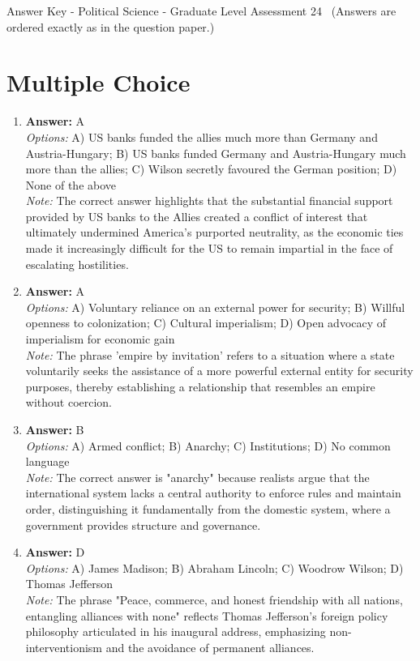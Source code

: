 \documentclass[12pt]{article}
\begin{document}
\begin{center}
Answer Key - Political Science - Graduate Level Assessment 24 \
\small (Answers are ordered exactly as in the question paper.)
\end{center}

\section*{Multiple Choice}
\begin{enumerate}[label=\arabic*.]
\item \textbf{Answer:} A
\\ \textit{Options:} A) US banks funded the allies much more than Germany and Austria-Hungary; B) US banks funded Germany and Austria-Hungary much more than the allies; C) Wilson secretly favoured the German position; D) None of the above
\\ \textit{Note:} The correct answer highlights that the substantial financial support provided by US banks to the Allies created a conflict of interest that ultimately undermined America's purported neutrality, as the economic ties made it increasingly difficult for the US to remain impartial in the face of escalating hostilities.
\item \textbf{Answer:} A
\\ \textit{Options:} A) Voluntary reliance on an external power for security; B) Willful openness to colonization; C) Cultural imperialism; D) Open advocacy of imperialism for economic gain
\\ \textit{Note:} The phrase 'empire by invitation' refers to a situation where a state voluntarily seeks the assistance of a more powerful external entity for security purposes, thereby establishing a relationship that resembles an empire without coercion.
\item \textbf{Answer:} B
\\ \textit{Options:} A) Armed conflict; B) Anarchy; C) Institutions; D) No common language
\\ \textit{Note:} The correct answer is "anarchy" because realists argue that the international system lacks a central authority to enforce rules and maintain order, distinguishing it fundamentally from the domestic system, where a government provides structure and governance.
\item \textbf{Answer:} D
\\ \textit{Options:} A) James Madison; B) Abraham Lincoln; C) Woodrow Wilson; D) Thomas Jefferson
\\ \textit{Note:} The phrase "Peace, commerce, and honest friendship with all nations, entangling alliances with none" reflects Thomas Jefferson's foreign policy philosophy articulated in his inaugural address, emphasizing non-interventionism and the avoidance of permanent alliances.

\end{enumerate}
\end{document}
